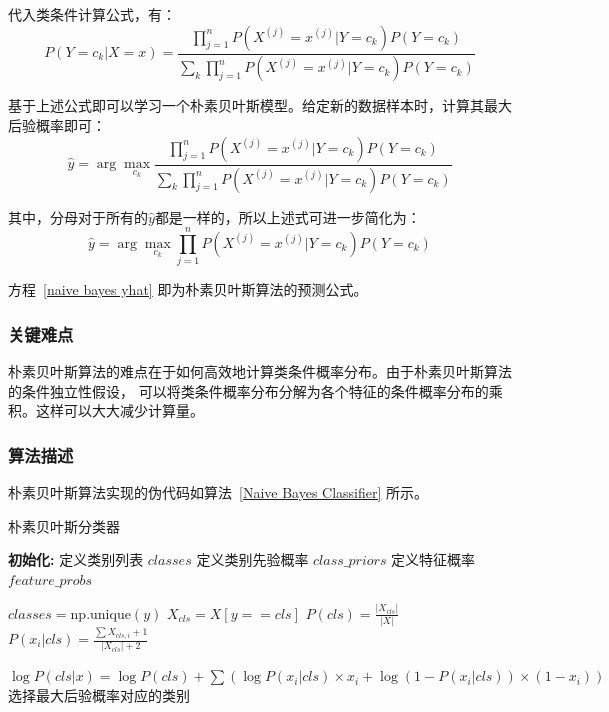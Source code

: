\documentclass[12pt]{article}
\begin{document}
代入类条件计算公式，有：
\begin{equation}
  P(Y = c_k | X = x) = \frac{\prod_{j=1}^{n} P(X^{(j)} = x^{(j)} | Y = c_k) P(Y = c_k)}{\sum_{k} \prod_{j=1}^{n} P(X^{(j)} = x^{(j)} | Y = c_k) P(Y = c_k)}
\end{equation}

基于上述公式即可以学习一个朴素贝叶斯模型。给定新的数据样本时，计算其最大后验概率即可：
\begin{equation}
  \hat{y} = \arg \max_{c_k} \frac{\prod_{j=1}^{n} P(X^{(j)} = x^{(j)} | Y = c_k) P(Y = c_k)}{\sum_{k} \prod_{j=1}^{n} P(X^{(j)} = x^{(j)} | Y = c_k) P(Y = c_k)}
\end{equation}

其中，分母对于所有的$\hat{y}$都是一样的，所以上述式可进一步简化为：
\begin{equation}
  \hat{y} = \arg \max_{c_k} \prod_{j=1}^{n} P(X^{(j)} = x^{(j)} | Y = c_k) P(Y = c_k)  \label{naive bayes yhat}
\end{equation}

方程~\ref{naive bayes yhat} 即为朴素贝叶斯算法的预测公式。

\subsubsection{关键难点}
朴素贝叶斯算法的难点在于如何高效地计算类条件概率分布。由于朴素贝叶斯算法的条件独立性假设，
可以将类条件概率分布分解为各个特征的条件概率分布的乘积。这样可以大大减少计算量。

\subsubsection{算法描述}
朴素贝叶斯算法实现的伪代码如算法~\ref{Naive Bayes Classifier} 所示。
\begin{algorithm}[H]
  \caption{朴素贝叶斯分类器}
  \label{Naive Bayes Classifier}
  \begin{algorithmic}[1]
    \State \textbf{初始化:}
    \State 定义类别列表 $classes$
    \State 定义类别先验概率 $class\_priors$
    \State 定义特征概率 $feature\_probs$

    \State $classes = \text{np.unique}(y)$
    \State $X_{cls} = X[y == cls]$
    \State $P(cls) = \frac{|X_{cls}|}{|X|}$
    \State $P(x_i | cls) = \frac{\sum X_{cls,i} + 1}{|X_{cls}| + 2}$
    \EndFor
    \EndProcedure

    \State $\log P(cls | x) = \log P(cls) + \sum (\log P(x_i | cls) \times x_i + \log (1 - P(x_i | cls)) \times (1 - x_i))$
    \EndFor
    \State 选择最大后验概率对应的类别
    \EndFor
    \EndProcedure
  \end{algorithmic}
\end{algorithm}
\end{document}
